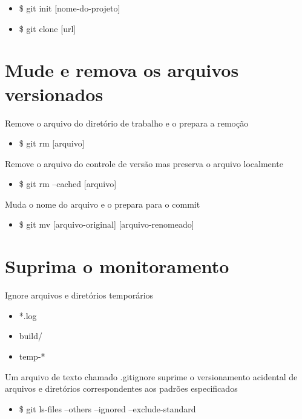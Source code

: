 \documentclass[]{tufte-handout}
\providecommand{\tightlist}{%
  \setlength{\itemsep}{0pt}\setlength{\parskip}{0pt}}
\begin{document}
\begin{itemize}
\item
  \$ git init {[}nome-do-projeto{]}
\item
  \$ git clone {[}url{]}
\end{itemize}

\section{Mude e remova os arquivos
versionados}\label{mude-e-remova-os-arquivos-versionados}

Remove o arquivo do diretório de trabalho e o prepara a remoção

\begin{itemize}
\tightlist
\item
  \$ git rm {[}arquivo{]}
\end{itemize}

Remove o arquivo do controle de versão mas preserva o arquivo localmente

\begin{itemize}
\tightlist
\item
  \$ git rm --cached {[}arquivo{]}
\end{itemize}

Muda o nome do arquivo e o prepara para o commit

\begin{itemize}
\tightlist
\item
  \$ git mv {[}arquivo-original{]} {[}arquivo-renomeado{]}
\end{itemize}

\section{Suprima o monitoramento}\label{suprima-o-monitoramento}

Ignore arquivos e diretórios temporários

\begin{itemize}
\tightlist
\item
  *.log
\item
  build/
\item
  temp-*
\end{itemize}

Um arquivo de texto chamado .gitignore suprime o versionamento acidental
de arquivos e diretórios correspondentes aos padrões especificados

\begin{itemize}
\tightlist
\item
  \$ git ls-files --others --ignored --exclude-standard
\end{itemize}
\end{document}
